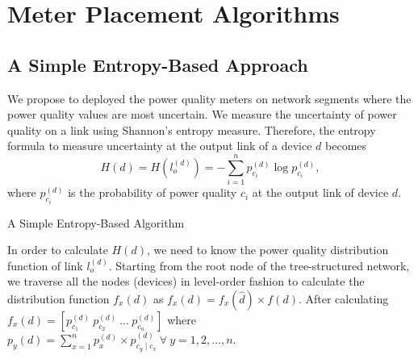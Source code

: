 \section{Meter Placement Algorithms}
\subsection{A Simple Entropy-Based Approach}
\label{sec:simpleH}
We propose to deployed the power quality meters on network segments where the power quality values are most uncertain. We measure the uncertainty of power quality on a link using Shannon's entropy measure. Therefore, the entropy formula to measure uncertainty at the output link of a device $d$ becomes
\[H(d) = H(l_{o}^{(d)}) = -\sum_{i=1}^n p_{c_i}^{(d)} \log p_{c_i}^{(d)},\]
where $p_{c_i}^{(d)}$ is the probability of power quality $c_i$ at the output link of device $d$.

\begin{algorithm}[!t]
\begin{small}
\caption{A Simple Entropy-Based Algorithm} \label{algo-1}
\end{small}
\end{algorithm}

In order to calculate $H(d)$, we need to know the power quality distribution function of link $l_{o}^{(d)}$. Starting from the root node of the tree-structured network, we traverse all the nodes (devices) in level-order fashion to calculate the distribution function $f_{x}(d)$ as $f_{x}(d) = f_x(\hat d) \times f(d)$. After calculating $f_{x}(d) = [p_{c_1}^{(d)} \ p_{c_2}^{(d)} \ \dots \ p_{c_n}^{(d)}]$ where $p_y(d) = \sum_{x=1}^n p_x^{(d)} \times p_{c_y \mid c_x}^{(d)} \ \forall \ y = 1,2,\dots,n$.

